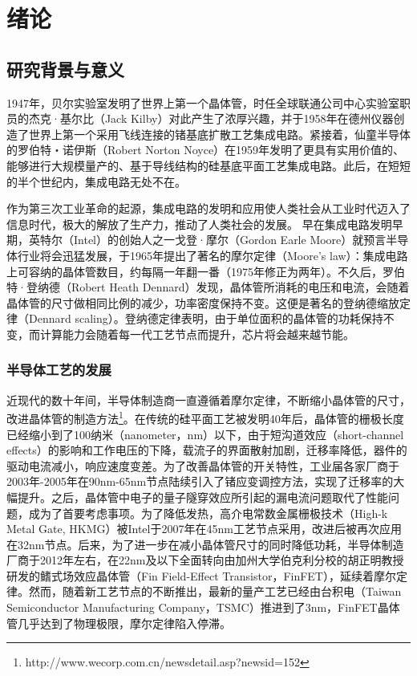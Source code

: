 \chapter{绪论}

\section{研究背景与意义}
1947年，贝尔实验室发明了世界上第一个晶体管，时任全球联通公司中心实验室职员的杰克·基尔比（Jack Kilby）对此产生了浓厚兴趣，并于1958年在德州仪器创造了世界上第一个采用飞线连接的锗基底扩散工艺集成电路。紧接着，仙童半导体的罗伯特・诺伊斯（Robert Norton Noyce）在1959年发明了更具有实用价值的、能够进行大规模量产的、基于导线结构的硅基底平面工艺集成电路。此后，在短短的半个世纪内，集成电路无处不在。

作为第三次工业革命的起源，集成电路的发明和应用使人类社会从工业时代迈入了信息时代，极大的解放了生产力，推动了人类社会的发展。
早在集成电路发明早期，英特尔（Intel）的创始人之一戈登·摩尔（Gordon Earle Moore）就预言半导体行业将会迅猛发展，于1965年提出了著名的摩尔定律（Moore's law）\cite{moore_law_0}：集成电路上可容纳的晶体管数目，约每隔一年翻一番（1975年修正为两年\cite{moore_law_1}）。不久后，罗伯特·登纳德（Robert Heath Dennard）发现，晶体管所消耗的电压和电流，会随着晶体管的尺寸做相同比例的减少，功率密度保持不变。这便是著名的登纳德缩放定律（Dennard scaling）\cite{dennard_scaling}。登纳德定律表明，由于单位面积的晶体管的功耗保持不变，而计算能力会随着每一代工艺节点而提升，芯片将会越来越节能。

\subsection{半导体工艺的发展}

近现代的数十年间，半导体制造商一直遵循着摩尔定律，不断缩小晶体管的尺寸，改进晶体管的制造方法\footnote{http://www.wecorp.com.cn/newsdetail.asp?newsid=152}。在传统的硅平面工艺被发明40年后，晶体管的栅极长度已经缩小到了100纳米（nanometer，nm）以下\cite{90nm_uniaxial_strained}，由于短沟道效应（short-channel effects）的影响\cite{short-channel_effect}和工作电压的下降，载流子的界面散射加剧，迁移率降低，器件的驱动电流减小，响应速度变差。为了改善晶体管的开关特性，工业届各家厂商于2003年-2005年在90nm-65nm节点陆续引入了锗应变调控方法\cite{90nm_ge_strained,65nm_strained}，实现了迁移率的大幅提升。之后，晶体管中电子的量子隧穿效应所引起的漏电流问题取代了性能问题，成为了首要考虑事项。为了降低发热，高介电常数金属栅极技术（High-k Metal Gate, HKMG）被Intel于2007年在45nm工艺节点采用\cite{45nm_hkmg}，改进后被再次应用在32nm节点\cite{32nm_hkmg_2nd}。后来，为了进一步在减小晶体管尺寸的同时降低功耗，半导体制造厂商于2012年左右，在22nm及以下全面转向由加州大学伯克利分校的胡正明教授研发的鳍式场效应晶体管（Fin Field-Effect Transistor，FinFET）\cite{FinFET}，延续着摩尔定律。然而，随着新工艺节点的不断推出，最新的量产工艺已经由台积电（Taiwan Semiconductor Manufacturing Company，TSMC）推进到了3nm，FinFET晶体管几乎达到了物理极限，摩尔定律陷入停滞。

